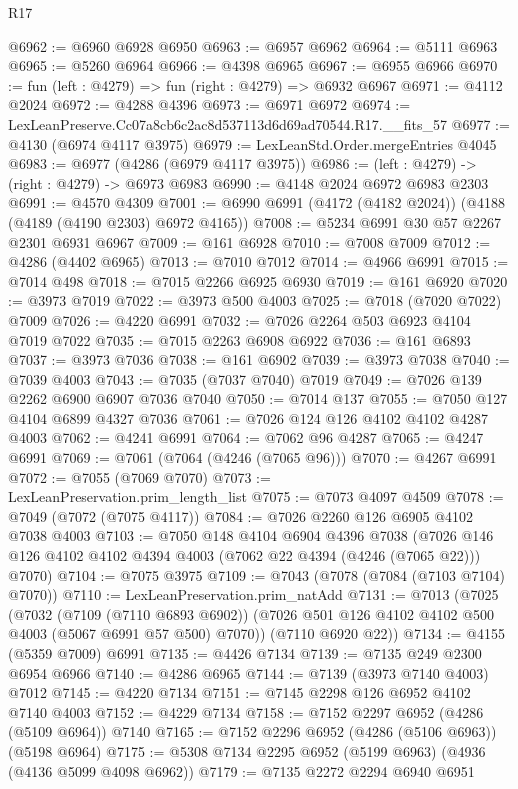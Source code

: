 \begin{lexlean}{R17}
\begin{coremodule}
@6962 := @6960 @6928 @6950
@6963 := @6957 @6962
@6964 := @5111 @6963
@6965 := @5260 @6964
@6966 := @4398 @6965
@6967 := @6955 @6966
@6970 := fun (left : @4279) => fun (right : @4279) => @6932 @6967
@6971 := @4112 @2024
@6972 := @4288 @4396
@6973 := @6971 @6972
@6974 := LexLeanPreserve.Cc07a8cb6c2ac8d537113d6d69ad70544.R17.__fits_57
@6977 := @4130 (@6974 @4117 @3975)
@6979 := LexLeanStd.Order.mergeEntries @4045
@6983 := @6977 (@4286 (@6979 @4117 @3975))
@6986 := (left : @4279) -> (right : @4279) -> @6973 @6983
@6990 := @4148 @2024 @6972 @6983 @2303
@6991 := @4570 @4309
@7001 := @6990 @6991 (@4172 (@4182 @2024)) (@4188 (@4189 (@4190 @2303) @6972 @4165))
@7008 := @5234 @6991 @30 @57 @2267 @2301 @6931 @6967
@7009 := @161 @6928
@7010 := @7008 @7009
@7012 := @4286 (@4402 @6965)
@7013 := @7010 @7012
@7014 := @4966 @6991
@7015 := @7014 @498
@7018 := @7015 @2266 @6925 @6930
@7019 := @161 @6920
@7020 := @3973 @7019
@7022 := @3973 @500 @4003
@7025 := @7018 (@7020 @7022) @7009
@7026 := @4220 @6991
@7032 := @7026 @2264 @503 @6923 @4104 @7019 @7022
@7035 := @7015 @2263 @6908 @6922
@7036 := @161 @6893
@7037 := @3973 @7036
@7038 := @161 @6902
@7039 := @3973 @7038
@7040 := @7039 @4003
@7043 := @7035 (@7037 @7040) @7019
@7049 := @7026 @139 @2262 @6900 @6907 @7036 @7040
@7050 := @7014 @137
@7055 := @7050 @127 @4104 @6899 @4327 @7036
@7061 := @7026 @124 @126 @4102 @4102 @4287 @4003
@7062 := @4241 @6991
@7064 := @7062 @96 @4287
@7065 := @4247 @6991
@7069 := @7061 (@7064 (@4246 (@7065 @96)))
@7070 := @4267 @6991
@7072 := @7055 (@7069 @7070)
@7073 := LexLeanPreservation.prim_length_list
@7075 := @7073 @4097 @4509
@7078 := @7049 (@7072 (@7075 @4117))
@7084 := @7026 @2260 @126 @6905 @4102 @7038 @4003
@7103 := @7050
    @148
    @4104
    @6904
    @4396
    @7038
    (@7026 @146 @126 @4102 @4102 @4394 @4003 (@7062 @22 @4394 (@4246 (@7065 @22))) @7070)
@7104 := @7075 @3975
@7109 := @7043 (@7078 (@7084 (@7103 @7104) @7070))
@7110 := LexLeanPreservation.prim_natAdd
@7131 := @7013
    (@7025
      (@7032
        (@7109 (@7110 @6893 @6902))
        (@7026 @501 @126 @4102 @4102 @500 @4003 (@5067 @6991 @57 @500) @7070))
      (@7110 @6920 @22))
@7134 := @4155 (@5359 @7009) @6991
@7135 := @4426 @7134
@7139 := @7135 @249 @2300 @6954 @6966
@7140 := @4286 @6965
@7144 := @7139 (@3973 @7140 @4003) @7012
@7145 := @4220 @7134
@7151 := @7145 @2298 @126 @6952 @4102 @7140 @4003
@7152 := @4229 @7134
@7158 := @7152 @2297 @6952 (@4286 (@5109 @6964)) @7140
@7165 := @7152 @2296 @6952 (@4286 (@5106 @6963)) (@5198 @6964)
@7175 := @5308 @7134 @2295 @6952 (@5199 @6963) (@4936 (@4136 @5099 @4098 @6962))
@7179 := @7135 @2272 @2294 @6940 @6951

\end{coremodule}
\end{lexlean}
